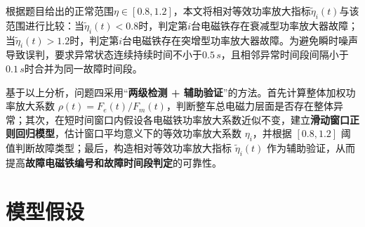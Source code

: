 \documentclass[a4paper]{nmmcm}
\begin{document}
根据题目给出的正常范围$\eta\in[0.8,1.2]$，本文将相对等效功率放大指标$\tilde{\eta}_i(t)$与该范围进行比较：当$\tilde{\eta}_i(t)<0.8$时，判定第$i$台电磁铁存在衰减型功率放大器故障；当$\tilde{\eta}_i(t)>1.2$时，判定第$i$台电磁铁存在突增型功率放大器故障。为避免瞬时噪声导致误判，要求异常状态连续持续时间不小于$0.5\,s$，且相邻异常时间段间隔小于$0.1\,s$时合并为同一故障时间段。

基于以上分析，问题四采用“\textbf{两级检测 + 辅助验证}”的方法。首先计算整体加权功率放大系数
$\rho(t)=F_e(t)/F_m(t)$，判断整车总电磁力层面是否存在整体异常；其次，在短时间窗口内假设各电磁铁功率放大系数近似不变，建立\textbf{滑动窗口正则回归模型}，估计窗口平均意义下的等效功率放大系数 $\eta_i$，并根据 $[0.8,1.2]$ 阈值判断故障类型；最后，构造相对等效功率放大指标 $\tilde{\eta}_i(t)$ 作为辅助验证，从而提高\textbf{故障电磁铁编号和故障时间段判定}的可靠性。



\section{模型假设}
\end{document}

